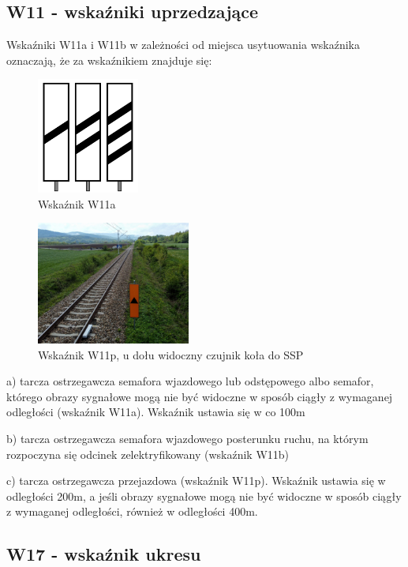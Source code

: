 \subsection{W11 - wskaźniki uprzedzające}
Wskaźniki W11a i W11b w zależności od miejsca usytuowania wskaźnika oznaczają, że za wskaźnikiem znajduje się:
\begin{figure}
	\includegraphics[width=0.3\textwidth]{skryptkierownik-img/wskaznik-w11a.png}
	\caption{Wskaźnik W11a}
	\label{fig:wskaznikw11a} 
\end{figure}
\begin{figure}
	\includegraphics[width=0.45\textwidth]{skryptkierownik-img/wskaznik-w11p.jpg}
	\caption{Wskaźnik W11p, u dołu widoczny czujnik koła do SSP} 
\end{figure}
a) tarcza ostrzegawcza semafora wjazdowego lub odstępowego albo semafor, którego obrazy sygnałowe mogą nie być widoczne w sposób ciągły z wymaganej odległości (wskaźnik W11a). Wskaźnik ustawia się w co 100m

b) tarcza ostrzegawcza semafora wjazdowego posterunku ruchu, na którym rozpoczyna się odcinek zelektryfikowany (wskaźnik W11b)

c) tarcza ostrzegawcza przejazdowa (wskaźnik W11p). Wskaźnik ustawia się w odległości 200m, a jeśli obrazy sygnałowe mogą nie być widoczne w sposób ciągły z wymaganej odległości, również w odległości 400m.


\subsection{W17 - wskaźnik ukresu}

